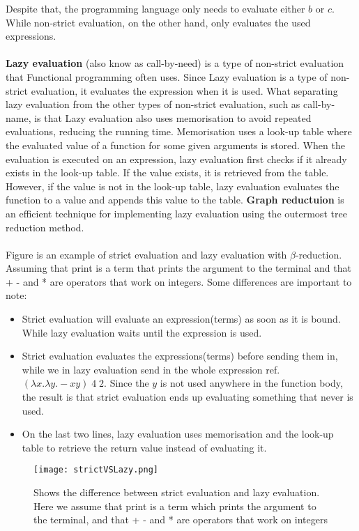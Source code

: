 Despite that, the programming language only needs to evaluate either $b$ or $c$. While non-strict evaluation, on the other hand,  only evaluates the used expressions.
\\ \\
\textbf{Lazy evaluation} (also know as call-by-need) is a type of non-strict evaluation that Functional programming often uses. Since Lazy evaluation is a type of non-strict evaluation, 
it evaluates the expression when it is used. What separating lazy evaluation from the other types of non-strict evaluation, such as call-by-name,
is that Lazy evaluation also uses memorisation to avoid repeated evaluations, reducing the running time. Memorisation uses a look-up table where the evaluated value of a function for some given arguments is stored. 
When the evaluation is executed on an expression, lazy evaluation first checks if it already exists in the look-up table. If the value exists, 
it is retrieved from the table. However, if the value is not in the look-up table, lazy evaluation evaluates the function to a value and appends this value to the table.
\textbf{Graph reductuion} is an efficient technique for implementing lazy evaluation using the outermost tree reduction method.
\\ \\
Figure  is  an example of strict evaluation and lazy evaluation with $\beta$-reduction. Assuming that print is a term that prints the argument to the terminal 
and that + - and * are operators that work on integers. Some differences are important to note:

\begin{itemize}
    \item Strict evaluation will evaluate an expression(terms) as soon as it is bound. While lazy evaluation waits until the expression is used.
    \item Strict evaluation evaluates the expressions(terms) before sending them in, while we in lazy evaluation send in the whole expression ref. $(\lambda x.\lambda y. - x y)\; 4 \; 2$. Since the $y$ is not used anywhere in the function body, the result is that strict evaluation ends up evaluating something that never is used.
    \item On the last two lines, lazy evaluation uses memorisation and the look-up table to retrieve the return value instead of evaluating it.
\end{itemize}


\begin{figure}
    \centering
    \texttt{[image: strictVSLazy.png]}
    \caption{Shows the difference between strict evaluation and lazy evaluation. Here we assume that print is a term which 
    prints the argument to the terminal, and that + - and * are operators that work on integers}
    \label{fig:strictVSLazy}
\end{figure}

